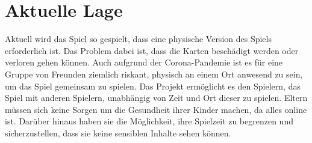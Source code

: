 \section{Aktuelle Lage}

Aktuell wird das Spiel so gespielt, dass eine physische Version des Spiels erforderlich ist. Das Problem dabei ist, dass die Karten beschädigt werden oder verloren gehen können. Auch aufgrund der Corona-Pandemie ist es für eine Gruppe von Freunden ziemlich riskant, physisch an einem Ort anwesend zu sein, um das Spiel gemeinsam zu spielen.  Das Projekt ermöglicht es den Spielern, das Spiel mit anderen Spielern, unabhängig von Zeit und Ort dieser zu spielen.  Eltern müssen sich keine Sorgen um die Gesundheit ihrer Kinder machen, da alles online ist. Darüber hinaus haben sie die Möglichkeit, ihre Spielzeit zu begrenzen und sicherzustellen, dass sie keine sensiblen Inhalte sehen können.